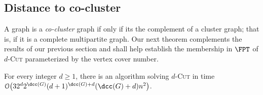 \documentclass[a4paper,UKenglish,cleveref, autoref]{lipics-v2019}
\newcommand{\bigO}[1]{\mathcal{O}\!\left(#1\right)}
\newcommand{\pname}[1]{\textsc{#1}}
\begin{document}
\subsection{Distance to co-cluster}
\label{sec:cocluster}

A graph is a \emph{co-cluster} graph if only if its the complement of a cluster graph; that is, if it is a complete multipartite graph.
Our next theorem complements the results of our previous section and shall help establish the membership  in $\FPT$ of \pname{$d$-Cut} parameterized by the vertex cover number.

\begin{theorem}
    \label{thm:fpt_cocluster}
    For every integer $d \geq 1$, there is an algorithm solving \pname{$d$-Cut} in time $\bigO{32^d2^{\dcc(G)}(d+1)^{\dcc(G)+d}(\dcc(G)+d)n^2}$.
\end{theorem}
\end{document}

